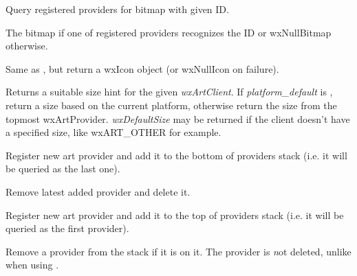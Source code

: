 Query registered providers for bitmap with given ID.






The bitmap if one of registered providers recognizes the ID or wxNullBitmap otherwise.


\label{wxartprovidergeticon}


Same as , but
return a wxIcon object (or wxNullIcon on failure).


Returns a suitable size hint for the given {\it wxArtClient}. If 
{\it platform\_default} is \true, return a size based on the current platform, 
otherwise return the size from the topmost wxArtProvider. {\it wxDefaultSize} may be 
returned if the client doesn't have a specified size, like wxART\_OTHER for example.


\label{wxartproviderinsert}


Register new art provider and add it to the bottom of providers stack (i.e.
it will be queried as the last one).




\label{wxartproviderctor}


Remove latest added provider and delete it.


\label{wxartproviderpush}


Register new art provider and add it to the top of providers stack (i.e. it
will be queried as the first provider).




\label{wxartproviderremove}


Remove a provider from the stack if it is on it. The provider is {\emph not} 
deleted, unlike when using .

